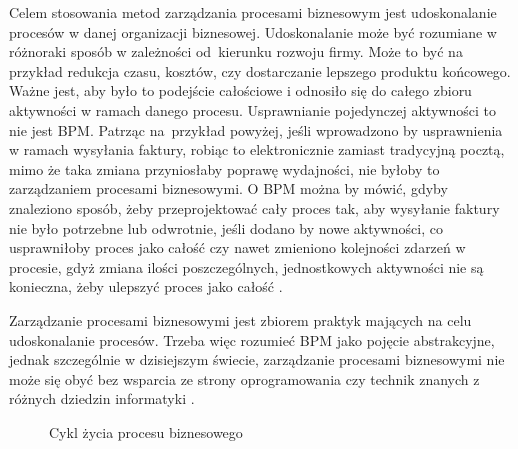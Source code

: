 Celem stosowania metod zarządzania procesami biznesowym jest udoskonalanie procesów w danej organizacji biznesowej. Udoskonalanie może być rozumiane w różnoraki sposób w zależności od~kierunku rozwoju firmy. Może to być na przykład redukcja czasu, kosztów, czy dostarczanie lepszego produktu końcowego. Ważne jest, aby było to podejście całościowe i odnosiło się do całego zbioru aktywności w ramach danego procesu. Usprawnianie pojedynczej aktywności to nie jest BPM. Patrząc na~przykład powyżej, jeśli wprowadzono by usprawnienia w ramach wysyłania faktury, robiąc to elektronicznie zamiast tradycyjną pocztą, mimo że taka zmiana przyniosłaby poprawę wydajności, nie byłoby to zarządzaniem procesami biznesowymi. O BPM można by mówić, gdyby znaleziono sposób, żeby przeprojektować cały proces tak, aby wysyłanie faktury nie było potrzebne lub odwrotnie, jeśli dodano by nowe aktywności, co usprawniłoby proces jako całość czy nawet zmieniono kolejności zdarzeń w procesie, gdyż zmiana ilości poszczególnych, jednostkowych aktywności nie są konieczna, żeby ulepszyć proces jako całość \cite{BPMWhat}.

Zarządzanie procesami biznesowymi jest zbiorem praktyk mających na celu udoskonalanie procesów. Trzeba więc rozumieć BPM jako pojęcie abstrakcyjne, jednak szczególnie w dzisiejszym świecie, zarządzanie procesami biznesowymi nie może się obyć bez wsparcia ze strony oprogramowania czy technik znanych z różnych dziedzin informatyki \cite{BPMSurvey}.

\begin{figure}[H]
	\caption{\label{fig:lifecycle}Cykl życia procesu biznesowego \cite{dumas2013fundamentals}}
\end{figure}

